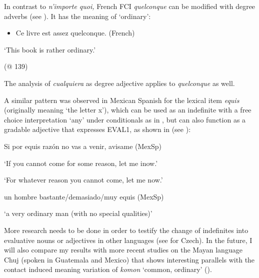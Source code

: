 \documentclass[output=paper]{langscibook}
\begin{document}
In contrast to \textit{n’importe quoi,} French FCI \textit{quelconque} can be modified with degree adverbs (see \citealt{Vlachou2007}). It has the meaning of ‘ordinary’:

\begin{itemize}
\item \begin{styleListParagraph}
\textmd{        Ce livre est assez quelconque.                                                                                   (French)}
\end{styleListParagraph}
\end{itemize}
\begin{styleListParagraph}
\textmd{‘This book is rather ordinary.’}
\end{styleListParagraph}

\begin{styleListParagraph}
\textmd{(@ 139)}
\end{styleListParagraph}

The analysis of \textit{cualquiera} as degree adjective applies to \textit{quelconque} as well.

  A similar pattern was observed in Mexican Spanish for the lexical item \textit{equis} (originally meaning ‘the letter x’), which can be used as an indefinite with a free choice interpretation ‘any’ under conditionals as in , but can also function as a gradable adjective that expresses EVAL1, as shown in  (see \citealt{Author2020a}):

\label{bkm:Ref63462361}    Si por equis razón no vas a venir, avisame  (MexSp)

    ‘If you cannot come for some reason, let me inow.’  

    ‘For whatever reason you cannot come, let me now.’  

    \citep[137]{Author2020a}

\label{bkm:Ref63462370}    un hombre bastante/demasiado/muy equis  (MexSp)

    ‘a very ordinary man (with no special qualities)’  

    \citep[138]{Author2020a}

More research needs to be done in order to testify the change of indefinites into evaluative nouns or adjectives in other languages (see \citealt{Šimík2008} for Czech). In the future, I will also compare my results with more recent studies on the Mayan language Chuj (spoken in Guatemala and Mexico) that shows interesting parallels with the contact induced meaning variation of \textit{komon} ‘common, ordinary’ (\citealt{Alonso-OvalleRoyer2023}).
\end{document}
